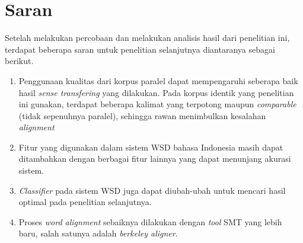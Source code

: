\section{Saran}
Setelah melakukan percobaan dan melakukan analisis hasil dari penelitian ini, terdapat beberapa saran untuk penelitian selanjutnya diantaranya sebagai berikut.

\begin{enumerate}
	\item Penggunaan kualitas dari korpus paralel dapat mempengaruhi seberapa baik hasil \textit{sense transfering} yang dilakukan. Pada korpus identik yang penelitian ini gunakan, terdapat beberapa kalimat yang terpotong maupun \textit{comparable} (tidak sepenuhnya paralel), sehingga rawan menimbulkan kesalahan \textit{alignment}
	\item Fitur yang digunakan dalam sistem WSD bahasa Indonesia masih dapat ditambahkan dengan berbagai fitur lainnya yang dapat menunjang akurasi sistem.
	\item \textit{Classifier} pada sistem WSD juga dapat diubah-ubah untuk mencari hasil optimal pada penelitian selanjutnya.
	\item Proses \textit{word alignment} sebaiknya dilakukan dengan \textit{tool} SMT yang lebih baru, salah satunya adalah \textit{berkeley aligner}.
\end{enumerate}